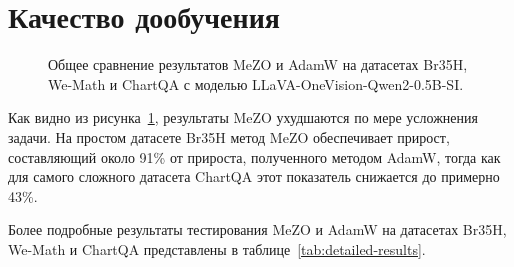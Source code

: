 \documentclass[LI,KR]{HSEUniversity}
\begin{document}
\section{Качество дообучения}

\begin{figure}[H]
  \centering
\begin{flushleft}
\end{flushleft}
\caption{Общее сравнение результатов MeZO и AdamW на датасетах Br35H, We-Math и ChartQA с моделью LLaVA-OneVision-Qwen2-0.5B-SI.}
  \label{fig:overallresultsplot}
\end{figure}

Как видно из рисунка~\ref{fig:overallresultsplot}, результаты MeZO ухудшаются по мере усложнения задачи.
На простом датасете Br35H метод MeZO обеспечивает прирост, составляющий около 91\% от прироста, полученного методом AdamW, тогда как для самого сложного датасета ChartQA этот показатель снижается до примерно 43\%.

Более подробные результаты тестирования MeZO и AdamW на датасетах Br35H, We-Math и ChartQA представлены в таблице~\ref{tab:detailed-results}.
\end{document}
